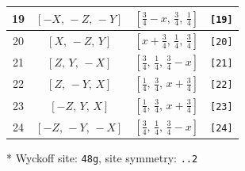 \documentclass[fleqn,8pt]{jsarticle}
\begin{document}
\begin{longtable}{cccc}
19 & $\left[ - X,\, - Z,\, - Y \right]$ & $\left[ \frac{3}{4} - x,\, \frac{3}{4},\, \frac{1}{4} \right]$ & {\tt [19]} \\ \hline
20 & $\left[ X,\, - Z,\, Y \right]$ & $\left[ x + \frac{3}{4},\, \frac{1}{4},\, \frac{3}{4} \right]$ & {\tt [20]} \\ \hline
21 & $\left[ Z,\, Y,\, - X \right]$ & $\left[ \frac{3}{4},\, \frac{1}{4},\, \frac{3}{4} - x \right]$ & {\tt [21]} \\ \hline
22 & $\left[ Z,\, - Y,\, X \right]$ & $\left[ \frac{1}{4},\, \frac{3}{4},\, x + \frac{3}{4} \right]$ & {\tt [22]} \\ \hline
23 & $\left[ - Z,\, Y,\, X \right]$ & $\left[ \frac{1}{4},\, \frac{3}{4},\, x + \frac{3}{4} \right]$ & {\tt [23]} \\ \hline
24 & $\left[ - Z,\, - Y,\, - X \right]$ & $\left[ \frac{3}{4},\, \frac{1}{4},\, \frac{3}{4} - x \right]$ & {\tt [24]} \\
\end{longtable}
* Wyckoff site: {\tt 48g}, site symmetry: {\tt ..2}
\renewcommand{\arraystretch}{1.2}
\end{document}
